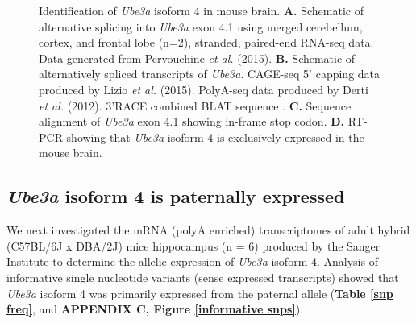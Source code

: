 \begin{figure}
  \centering
  \caption{Identification of \textit{Ube3a} isoform 4 in mouse brain. \textbf{A.} Schematic of alternative splicing into \textit{Ube3a} exon 4.1 using merged cerebellum, cortex, and frontal lobe (n=2), stranded, paired-end RNA-seq data. Data generated from Pervouchine \textit{et al.} (2015). \textbf{B.} Schematic of alternatively spliced transcripts of \textit{Ube3a}. CAGE-seq 5' capping data produced by Lizio \textit{et al.} (2015). PolyA-seq data produced by Derti \textit{et al.} (2012). 3'RACE combined BLAT sequence \drawRACE[raceGreen]. \textbf{C.} Sequence alignment of \textit{Ube3a} exon 4.1 showing in-frame stop codon. \textbf{D.} RT-PCR showing that \textit{Ube3a} isoform 4 is exclusively expressed in the mouse brain.}
  \label{sense annotation}
\end{figure}
\subsection{\textit{Ube3a} isoform 4 is paternally expressed}
We next investigated the mRNA (polyA enriched) transcriptomes of adult hybrid (C57BL/6J x DBA/2J) mice hippocampus (n = 6) produced by the Sanger Institute to determine the allelic expression of \textit{Ube3a} isoform 4. Analysis of informative single nucleotide variants (sense expressed transcripts) showed that \textit{Ube3a} isoform 4 was primarily expressed from the paternal allele (\textbf{Table \ref{snp freq}}, and \textbf{APPENDIX C, Figure \ref{informative snps}}).

